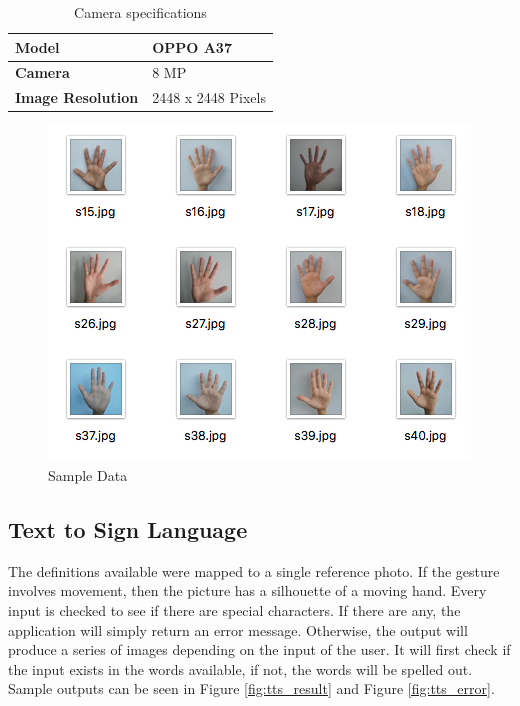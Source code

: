 \documentclass[journal]{./IEEE/IEEEtran}
\begin{document}
\begin{table}[ht!]
\centering
\caption{Camera specifications}
\begin{tabular}{|l|l|}
\hline
\textbf{Model}            & OPPO A37           \\ \hline
\textbf{Camera}           & 8 MP               \\ \hline
\textbf{Image Resolution} & 2448 x 2448 Pixels \\ \hline
\end{tabular}
\end{table}

\begin{figure}[ht!]
    \centering
    \includegraphics[width=1\linewidth]{./images/data.png}
    \caption{Sample Data}
    \label{fig:data}
\end{figure}

\subsection{Text to Sign Language}
The definitions available were mapped to a single reference photo. If the gesture involves movement, then the picture has a silhouette of a moving hand.
\newline
\indent Every input is checked to see if there are special characters. If there are any, the application will simply return an error message. Otherwise, the output will produce a series of images depending on the input of the user. It will first check if the input exists in the words available, if not, the words will be spelled out. Sample outputs can be seen in Figure \ref{fig:tts_result} and Figure \ref{fig:tts_error}.
\end{document}

